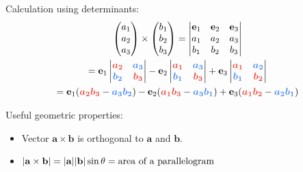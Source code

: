 \begin{multicols}{2}
\begin{CheatsheetEntryFrame}
        Calculation using determinants:
        \begin{gather*}
                \begin{pmatrix}
                    a_1 \\
                    a_2 \\
                    a_3
                \end{pmatrix}
                \times
                \begin{pmatrix}
                    b_1 \\
                    b_2 \\
                    b_3
                \end{pmatrix}
                =
                \begin{vmatrix}
                    \mathbf{e}_1 & \mathbf{e}_2 & \mathbf{e}_3 \\
                    a_1          & a_2          & a_3          \\
                    b_1          & b_2          & b_3
                \end{vmatrix}
            \\
                =
                \mathbf{e}_1
                \begin{vmatrix}
                    \memphR{a_2} & \memphB{a_3} \\
                    \memphB{b_2} & \memphR{b_3}
                \end{vmatrix}
                -
                \mathbf{e}_2
                \begin{vmatrix}
                    \memphR{a_1} & \memphB{a_3} \\
                    \memphB{b_1} & \memphR{b_3}
                \end{vmatrix}
                +
                \mathbf{e}_3
                \begin{vmatrix}
                    \memphR{a_1} & \memphB{a_2} \\
                    \memphB{b_1} & \memphR{b_2}
                \end{vmatrix}
            \\
                = \mathbf{e}_1 \parens*{\memphR{a_2 b_3} - \memphB{a_3 b_2}}
                - \mathbf{e}_2 \parens*{\memphR{a_1 b_3} - \memphB{a_3 b_1}}
                + \mathbf{e}_3 \parens*{\memphR{a_1 b_2} - \memphB{a_2 b_1}}
        \end{gather*}

        Useful geometric properties:
        \begin{itemize}
            \item Vector $\mathbf{a} \times \mathbf{b}$ is orthogonal to $\mathbf{a}$ and $\mathbf{b}$.
            \item $\abs*{\mathbf{a} \times \mathbf{b}} = \abs*{\mathbf{a}} \abs*{\mathbf{b}} \sin{\theta} = \text{area of a parallelogram}$
        \end{itemize}


\end{CheatsheetEntryFrame}
\end{multicols}
